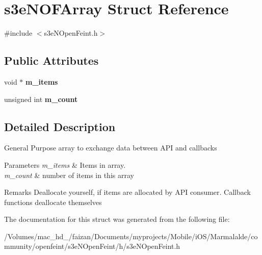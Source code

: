 \hypertarget{structs3e_n_o_f_array}{
\section{s3eNOFArray Struct Reference}
\label{structs3e_n_o_f_array}
}


{\ttfamily \#include $<$s3eNOpenFeint.h$>$}

\subsection*{Public Attributes}
\begin{DoxyCompactItemize}
\item 
\hypertarget{structs3e_n_o_f_array_ade3e4e3e8e472baf7728664230385c90}{
void $\ast$ {\bfseries m\_\-items}}
\label{structs3e_n_o_f_array_ade3e4e3e8e472baf7728664230385c90}

\item 
\hypertarget{group___n_open_feint_api_group_gaa30bf01aa490f0e36cc36c2b390037f0}{
unsigned int {\bfseries m\_\-count}}
\label{group___n_open_feint_api_group_gaa30bf01aa490f0e36cc36c2b390037f0}

\end{DoxyCompactItemize}


\subsection{Detailed Description}
General Purpose array to exchange data between API and callbacks 
\begin{DoxyParams}{Parameters}
{\em m\_\-items} & Items in array. \\
\hline
{\em m\_\-count} & number of items in this array \\
\hline
\end{DoxyParams}
\begin{DoxyRemark}{Remarks}
Deallocate yourself, if items are allocated by API consumer. Callback functions deallocate themselves 
\end{DoxyRemark}


The documentation for this struct was generated from the following file:\begin{DoxyCompactItemize}
\item 
/Volumes/mac\_\-hd\_/faizan/Documents/myprojects/Mobile/iOS/Marmalalde/community/openfeint/s3eNOpenFeint/h/s3eNOpenFeint.h\end{DoxyCompactItemize}
